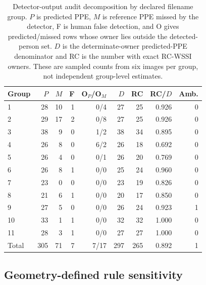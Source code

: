 \documentclass[iicol,pdflatex,sn-mathphys-num]{sn-jnl}
\begin{document}
\begin{table}[t]
\caption{Detector-output audit decomposition by declared filename group. $P$ is predicted PPE, $M$ is reference PPE missed by the detector, F is human false detection, and O gives predicted/missed rows whose owner lies outside the detected-person set. $D$ is the determinate-owner predicted-PPE denominator and RC is the number with exact RC-WSSI owners. These are sampled counts from six images per group, not independent group-level estimates.}
\label{tab:endtoendsource}
\centering
\scriptsize
\setlength{\tabcolsep}{4pt}
\begin{tabular}{@{}l r r r r r r r r@{}}
\toprule
Group & $P$ & $M$ & F & O$_P$/O$_M$ & $D$ & RC & RC/$D$ & Amb. \\
\midrule
1 & 28 & 10 & 1 & 0/4 & 27 & 25 & 0.926 & 0 \\
2 & 29 & 17 & 2 & 0/8 & 27 & 25 & 0.926 & 0 \\
3 & 38 & 9 & 0 & 1/2 & 38 & 34 & 0.895 & 0 \\
4 & 26 & 8 & 0 & 6/2 & 26 & 18 & 0.692 & 0 \\
5 & 26 & 4 & 0 & 0/1 & 26 & 20 & 0.769 & 0 \\
6 & 26 & 8 & 1 & 0/0 & 25 & 24 & 0.960 & 0 \\
7 & 23 & 0 & 0 & 0/0 & 23 & 19 & 0.826 & 0 \\
8 & 21 & 6 & 1 & 0/0 & 20 & 17 & 0.850 & 0 \\
9 & 27 & 5 & 0 & 0/0 & 26 & 24 & 0.923 & 1 \\
10 & 33 & 1 & 1 & 0/0 & 32 & 32 & 1.000 & 0 \\
11 & 28 & 3 & 1 & 0/0 & 27 & 27 & 1.000 & 0 \\
\midrule
Total & 305 & 71 & 7 & 7/17 & 297 & 265 & 0.892 & 1 \\
\bottomrule
\end{tabular}
\end{table}

\subsection{Geometry-defined rule sensitivity}
\end{document}
